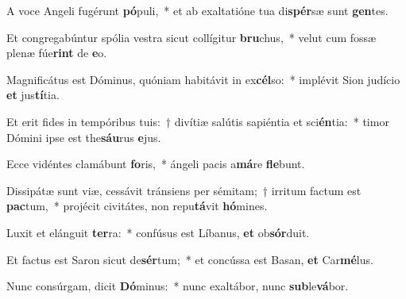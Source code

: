 \item A voce Angeli fugérunt \textbf{pó}puli,~* et ab exaltatióne tua di\textbf{spér}sæ sunt \textbf{gen}tes.
\item Et congregabúntur spólia vestra sicut collígitur \textbf{bru}chus,~* velut cum fossæ plenæ fúe\textbf{rint} de \textbf{e}o.
\item Magnificátus est Dóminus, quóniam habitávit in ex\textbf{cél}so:~* implévit Sion judício \textbf{et} jus\textbf{tí}tia.
\item Et erit fides in tempóribus tuis:~† divítiæ salútis sapiéntia et sci\textbf{én}tia:~* timor Dómini ipse est the\textbf{sáu}rus \textbf{e}jus.
\item Ecce vidéntes clamábunt \textbf{fo}ris,~* ángeli pacis a\textbf{má}re \textbf{fle}bunt.
\item Dissipátæ sunt viæ, cessávit tránsiens per sémitam;~† irritum factum est \textbf{pac}tum,~* projécit civitátes, non repu\textbf{tá}vit \textbf{hó}mines.
\item Luxit et elánguit \textbf{ter}ra:~* confúsus est Líbanus, \textbf{et} ob\textbf{sór}duit.
\item Et factus est Saron sicut de\textbf{sér}tum;~* et concússa est Basan, \textbf{et} Car\textbf{mé}lus.
\item Nunc consúrgam, dicit \textbf{Dó}minus:~* nunc exaltábor, nunc \textbf{sub}le\textbf{vá}bor.
